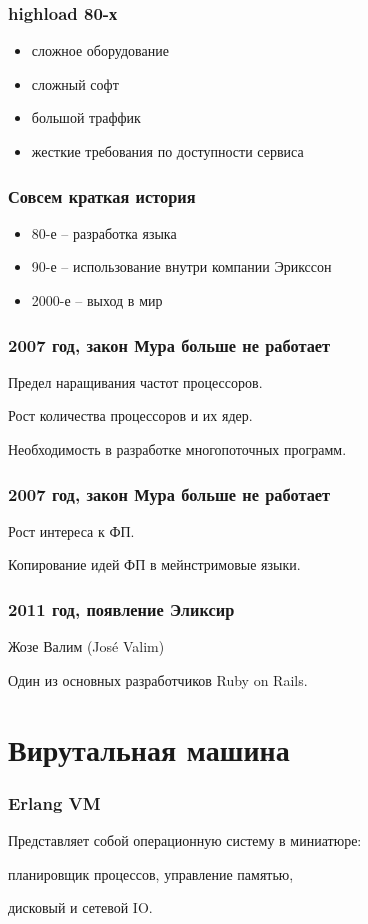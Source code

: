\documentclass[10pt]{beamer}
\begin{document}
\begin{frame}
\frametitle{highload 80-х}
\begin{itemize}
\item сложное оборудование
\item сложный софт
\item большой траффик
\item жесткие требования по доступности сервиса
\end{itemize}
\end{frame}

\begin{frame}
\frametitle{Совсем краткая история}
\begin{itemize}
\item 80-е -- разработка языка
\item 90-е -- использование внутри компании Эрикссон
\item 2000-е -- выход в мир
\end{itemize}
\end{frame}

\begin{frame}
\frametitle{2007 год, закон Мура больше не работает}
\centering
Предел наращивания частот процессоров.
\par \bigskip
Рост количества процессоров и их ядер.
\par \bigskip
Необходимость в разработке многопоточных программ.
\end{frame}

\begin{frame}
\frametitle{2007 год, закон Мура больше не работает}
\centering
Рост интереса к ФП.
\par \bigskip
Копирование идей ФП в мейнстримовые языки.
\end{frame}

\begin{frame}
\frametitle{2011 год, появление Эликсир}
\centering
Жозе Валим (José Valim)
\par \bigskip
Один из основных разработчиков Ruby on Rails.
\end{frame}


\section{Вирутальная машина}

\begin{frame}
\frametitle{Erlang VM}
\centering
Представляет собой операционную систему в миниатюре:
\par \bigskip
планировщик процессов, управление памятью,
\par
дисковый и сетевой IO.
\end{frame}
\end{document}
